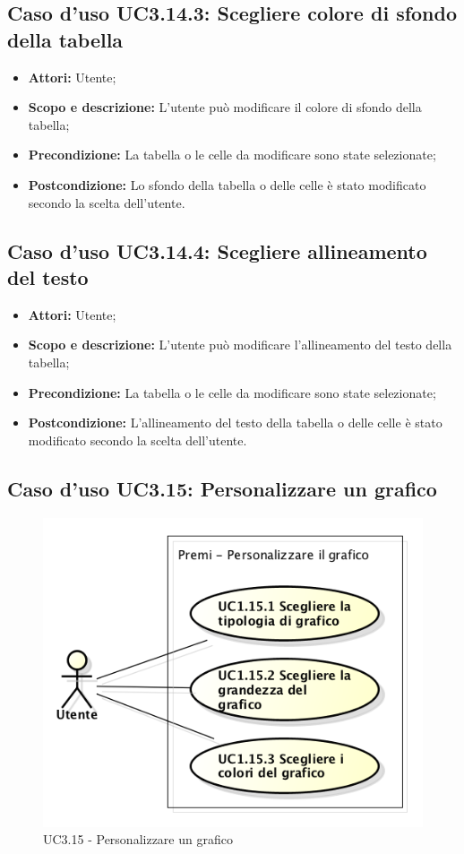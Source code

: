 \subsection{Caso d'uso UC3.14.3: Scegliere colore di sfondo della tabella}
\begin{itemize}
	\item \textbf{Attori:} Utente;
	\item \textbf{Scopo e descrizione:} L'utente può modificare il colore di sfondo della tabella;
	\item \textbf{Precondizione:} La tabella o le celle da modificare sono state selezionate;
	\item \textbf{Postcondizione:} Lo sfondo della tabella o delle celle è stato modificato secondo la scelta dell'utente.
\end{itemize}

\subsection{Caso d'uso UC3.14.4: Scegliere allineamento del testo}
\begin{itemize}
	\item \textbf{Attori:} Utente;
	\item \textbf{Scopo e descrizione:} L'utente può modificare l'allineamento del testo della tabella;
	\item \textbf{Precondizione:} La tabella o le celle da modificare sono state selezionate;
	\item \textbf{Postcondizione:} L'allineamento del testo della tabella o delle celle è stato modificato secondo la scelta dell'utente.
\end{itemize}

\subsection{Caso d'uso UC3.15: Personalizzare un grafico}
\begin{figure}[h] 
	\centering 
	\includegraphics[scale=0.45] {img/UC3.15.png} 
	\caption{UC3.15 - Personalizzare un grafico} 
\end{figure}

